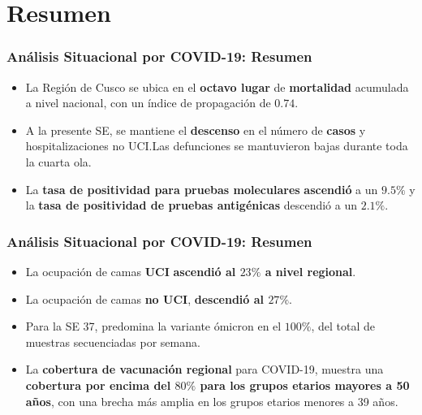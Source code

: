 \documentclass[xcolor=table]{beamer}
\begin{document}
\section{Resumen}
\begin{frame}[label=Resumen]
	\frametitle{Análisis Situacional por COVID-19: Resumen}
	\vspace{-.5cm}
	\begin{itemize}
		\item La Región de Cusco se ubica en el \textbf{\color{mycolor4}octavo lugar} de \textbf{\color{mycolor3}mortalidad} acumulada a nivel nacional, con un índice de propagación de $0.74 $.   
		\item A la presente SE, se mantiene el \textbf{\color{mycolor4} descenso} en el número de \textbf{\color{mycolor3}casos} y hospitalizaciones no UCI.Las defunciones se mantuvieron bajas durante toda la cuarta ola.
		\item La \textbf{\color{mycolor3}tasa de positividad para pruebas moleculares} \textbf{\color{mycolor4}ascendió} a un $9.5\%$ y la \textbf{\color{mycolor3}tasa de positividad de pruebas antigénicas} descendió a un $2.1\%$.
	\end{itemize}
\end{frame}

\begin{frame}
	\frametitle{Análisis Situacional por COVID-19: Resumen}
	\vspace{-.5cm}
	\begin{itemize}
	\item La ocupación de camas \textbf{\color{mycolor3}UCI} \textbf{\color{mycolor3} ascendió al $23\%$ a nivel regional}.
	\item La ocupación de camas \textbf{\color{mycolor3}no UCI}, \textbf{\color{mycolor4}descendió al $27\%$}. 
	\item Para la SE 37, predomina la variante ómicron en el $100\%$, del total de muestras secuenciadas por semana.
	\item La \textbf{\color{mycolor3}cobertura de vacunación regional} para COVID-19, muestra una \textbf{\color{mycolor4}cobertura por encima del $80\%$ para los grupos etarios mayores a 50 años}, con una brecha más amplia en los grupos etarios menores a 39 años.	
	\end{itemize}
\end{frame}
\end{document}
